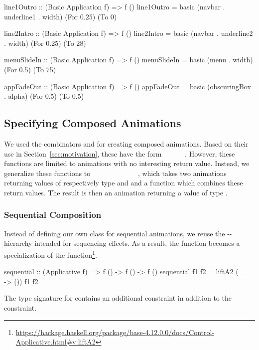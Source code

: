\begin{code}
line1Outro :: (Basic Application f) => f ()
line1Outro = basic (navbar . underline1 . width) (For 0.25) (To 0)

line2Intro :: (Basic Application f) => f ()
line2Intro = basic (navbar . underline2 . width) (For 0.25) (To 28)

menuSlideIn :: (Basic Application f) => f ()
menuSlideIn = basic (menu . width) (For 0.5) (To 75)

appFadeOut :: (Basic Application f) => f ()
appFadeOut = basic (obscuringBox . alpha) (For 0.5) (To 0.5)
\end{code}

\subsection{Specifying Composed Animations}

We used the combinators  and  for creating composed animations. Based on their use in Section~\ref{sec:motivation}, these have the form ~\hs{()}~\hs{->}~~\hs{->}~~\hs{()}. However, these functions are limited to animations with no interesting return value. Instead, we generalize these functions to \hs{(}~\hs{->}~~\hs{->}~\hs{)}~\hs{->}~~~\hs{->}~~~\hs{->}~~, which takes two animations returning values of respectively type  and  and a function which combines these return values. The result is then an animation returning a value of type .

\subsubsection{Sequential Composition}

Instead of defining our own class for sequential animations, we reuse the -- hierarchy intended for sequencing effects. As a result, the  function becomes a specialization of the  function\footnote{\url{https://hackage.haskell.org/package/base-4.12.0.0/docs/Control-Applicative.html#v:liftA2}}.

\begin{code}
sequential :: (Applicative f) => f () -> f () -> f ()
sequential f1 f2 = liftA2 (\_ _ -> ()) f1 f2
\end{code}

The type signature for  contains an additional  constraint in addition to the  constraint.

